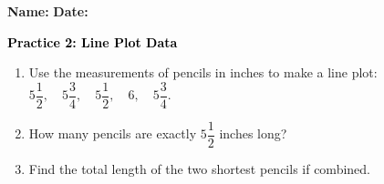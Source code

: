 \documentclass[12pt, letterpaper, fleqn]{article}
\begin{document}
\textbf{Name:} \underline{\hspace{5cm}}
\hfill
\textbf{Date:} \underline{\hspace{3cm}}\\

\begin{tcolorbox}[colback=customteal!20]
    \large\textcolor{black}{\textbf{Practice 2: Line Plot Data}}
\end{tcolorbox}
\begin{enumerate}[itemsep=3.5cm, leftmargin=0.6cm]
\item Use the measurements of pencils in inches to make a line plot: $5\dfrac{1}{2}, \quad 5\dfrac{3}{4}, \quad 5\dfrac{1}{2}, \quad 6, \quad 5\dfrac{3}{4}$.
\vspace{4cm}
\item How many pencils are exactly $5\dfrac{1}{2}$ inches long?
\vspace{3cm}
\item Find the total length of the two shortest pencils if combined.
\end{enumerate}
\end{document}
